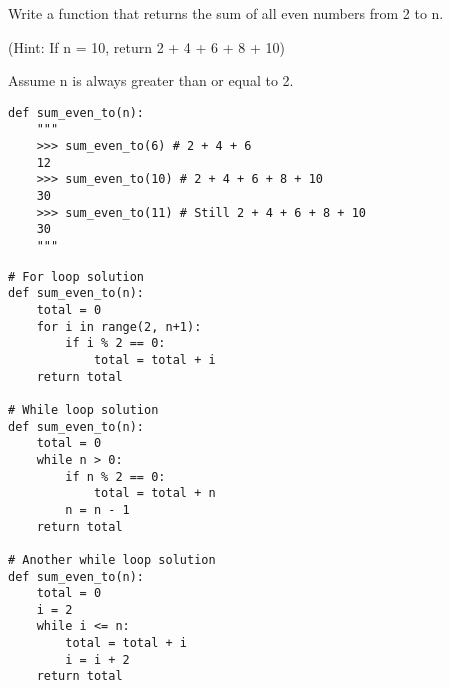 \begin{blocksection}
\question Write a function that returns the sum of all even numbers from 2 to n. 

(Hint: If n = 10, return 2 + 4 + 6 + 8 + 10)

Assume n is always greater than or equal to 2.

\begin{lstlisting}
def sum_even_to(n): 
    """
    >>> sum_even_to(6) # 2 + 4 + 6
    12
    >>> sum_even_to(10) # 2 + 4 + 6 + 8 + 10
    30
    >>> sum_even_to(11) # Still 2 + 4 + 6 + 8 + 10
    30
    """

\end{lstlisting}

\begin{solution}[1.5in]
\begin{lstlisting}
# For loop solution
def sum_even_to(n): 
    total = 0
    for i in range(2, n+1):
        if i % 2 == 0:
            total = total + i
    return total

# While loop solution
def sum_even_to(n): 
    total = 0
    while n > 0:
        if n % 2 == 0:
            total = total + n
        n = n - 1
    return total

# Another while loop solution
def sum_even_to(n):
    total = 0
    i = 2
    while i <= n:
        total = total + i
        i = i + 2
    return total
\end{lstlisting}
\end{solution}
\end{blocksection}

